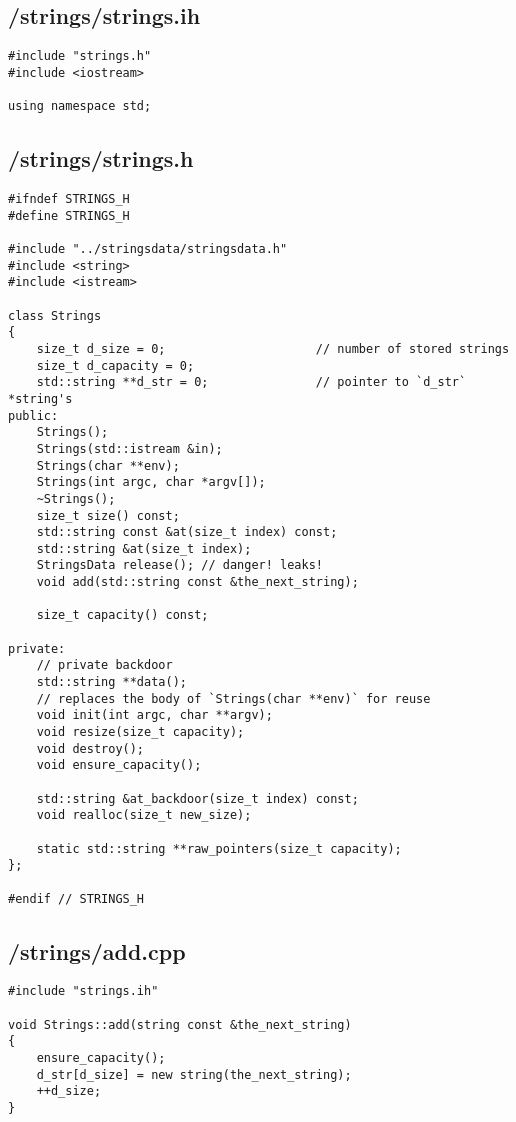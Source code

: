 \documentclass{article}
\begin{document}
\subsection*{/strings/strings.ih}
\begin{verbatim}
#include "strings.h"
#include <iostream>

using namespace std;

\end{verbatim}
\subsection*{/strings/strings.h}
\begin{verbatim}
#ifndef STRINGS_H
#define STRINGS_H

#include "../stringsdata/stringsdata.h"
#include <string>
#include <istream>

class Strings 
{
    size_t d_size = 0;                     // number of stored strings
    size_t d_capacity = 0;
    std::string **d_str = 0;               // pointer to `d_str` *string's
public:
    Strings();
    Strings(std::istream &in);
    Strings(char **env);
    Strings(int argc, char *argv[]);
    ~Strings();
    size_t size() const;
    std::string const &at(size_t index) const;
    std::string &at(size_t index);
    StringsData release(); // danger! leaks!
    void add(std::string const &the_next_string);

    size_t capacity() const;

private:
    // private backdoor
    std::string **data();
    // replaces the body of `Strings(char **env)` for reuse
    void init(int argc, char **argv);
    void resize(size_t capacity);
    void destroy();
    void ensure_capacity();

    std::string &at_backdoor(size_t index) const;
    void realloc(size_t new_size);
    
    static std::string **raw_pointers(size_t capacity);
};

#endif // STRINGS_H

\end{verbatim}
\subsection*{/strings/add.cpp}
\begin{verbatim}
#include "strings.ih"

void Strings::add(string const &the_next_string)
{
    ensure_capacity();
    d_str[d_size] = new string(the_next_string);
    ++d_size;
}
\end{verbatim}
\end{document}
